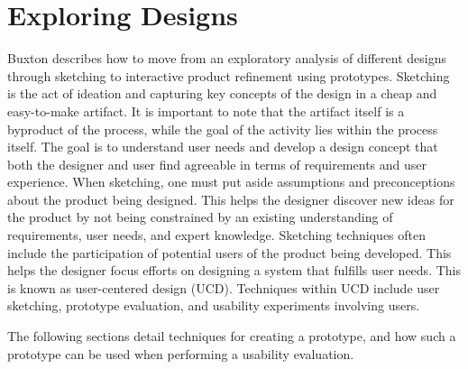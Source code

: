 \section{Exploring Designs} %
Buxton\cite{BUXTON2007135_skething,BUXTON2007139_prototyping} describes how to move from an exploratory analysis of different designs through sketching to interactive product refinement using prototypes. 
Sketching is the act of ideation and capturing key concepts of the design in a cheap and easy-to-make artifact. 
It is important to note that the artifact itself is a byproduct of the process, while the goal of the activity lies within the process itself.\cite{BUXTON2007135_skething}
The goal is to understand user needs and develop a design concept that both the designer and user find agreeable in terms of requirements and user experience. 
When sketching, one must put aside assumptions and preconceptions about the product being designed.
This helps the designer discover new ideas for the product by not being constrained by an existing understanding of requirements, user needs, and expert knowledge.
Sketching techniques often include the participation of potential users of the product being developed.
This helps the designer focus efforts on designing a system that fulfills user needs.
This is known as user-centered design (UCD). \cite{user-centred-design}
Techniques within UCD include user sketching, prototype evaluation, and usability experiments involving users.

The following sections detail techniques for creating a prototype, and how such a prototype can be used when performing a usability evaluation.